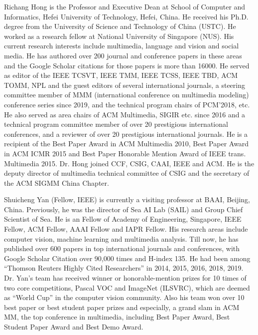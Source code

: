 \documentclass[10pt,journal,compsoc]{IEEEtran}
\begin{document}
\begin{IEEEbiography}{Richang Hong} is the Professor and Executive Dean
at School of Computer and Informatics, Hefei University of Technology, Hefei, China. He received his Ph.D. degree from the University of Science and Technology of China (USTC). He worked as a research fellow at National University of Singapore (NUS). His current research interests include multimedia, language and vision and social media. He has authored over 200 journal and conference papers in these areas and the Google Scholar citations for those papers is more than 16000. He served as editor of the IEEE TCSVT, IEEE TMM, IEEE TCSS, IEEE TBD, ACM TOMM, NPL and the guest editors of several international journals, a steering committee member of MMM (international conference on multimedia modeling) conference series since 2019, and the technical program chairs of PCM'2018, etc. He also served as area chairs of ACM Multimedia, SIGIR etc. since 2016 and a technical program committee member of over 20 prestigious international conferences, and a reviewer of over 20 prestigious international journals. He is a recipient of the Best Paper Award in ACM Multimedia 2010, Best Paper Award in ACM ICMR 2015 and Best Paper Honorable Mention Award of IEEE trans. Multimedia 2015. Dr. Hong joined CCF, CSIG, CAAI, IEEE and ACM. He is the deputy director of multimedia technical committee of CSIG and the secretary of the ACM SIGMM China Chapter.
\end{IEEEbiography}

\begin{IEEEbiography}{Shuicheng Yan} (Fellow, IEEE) is currently a visiting professor at BAAI, Beijing, China. Previously, he was the director of Sea AI Lab (SAIL) and Group Chief Scientist of Sea. He is an Fellow of Academy of Engineering, Singapore, IEEE Fellow, ACM
Fellow, AAAI Fellow and IAPR Fellow. His research areas include computer vision, machine learning and multimedia analysis. Till now, he has published over 600
papers in top international journals and conferences, with Google Scholar Citation over 90,000 times and H-index 135. He had been among
“Thomson Reuters Highly Cited Researchers” in 2014, 2015, 2016, 2018, 2019. Dr. Yan’s team has received winner or honorable-mention prizes for 10 times of two core competitions, Pascal VOC and ImageNet (ILSVRC), which are deemed as “World Cup” in the computer vision community. Also his team won over 10 best paper or best student paper prizes and especially, a grand slam in ACM MM, the top conference in multimedia, including Best Paper Award, Best Student Paper Award and Best Demo Award.
\end{IEEEbiography}
\end{document}
